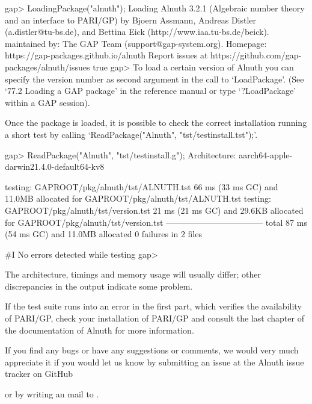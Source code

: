 \beginexample
    gap> LoadingPackage("alnuth");
    Loading  Alnuth 3.2.1 (Algebraic number theory and an interface to PARI/GP)
    by Bjoern Assmann,
       Andreas Distler (a.distler@tu-bs.de), and
       Bettina Eick (http://www.iaa.tu-bs.de/beick).
    maintained by:
       The GAP Team (support@gap-system.org).
    Homepage: https://gap-packages.github.io/alnuth
    Report issues at https://github.com/gap-packages/alnuth/issues
    true
    gap>
\endexample
To load a certain version of Alnuth you can specify the version number as
second argument in the call to `LoadPackage'. (See `77.2 Loading a GAP
package' in the reference manual or type `?LoadPackage' within a GAP session).

Once the package is loaded, it is possible to check the correct installation
running a short test by calling `ReadPackage("Alnuth",
"tst/testinstall.tst");'.

\beginexample
    gap> ReadPackage("Alnuth", "tst/testinstall.g");
    Architecture: aarch64-apple-darwin21.4.0-default64-kv8

    testing: GAPROOT/pkg/alnuth/tst/ALNUTH.tst
          66 ms (33 ms GC) and 11.0MB allocated for GAPROOT/pkg/alnuth/tst/ALNUTH.tst
    testing: GAPROOT/pkg/alnuth/tst/version.tst
          21 ms (21 ms GC) and 29.6KB allocated for GAPROOT/pkg/alnuth/tst/version.tst
    -----------------------------------
    total        87 ms (54 ms GC) and 11.0MB allocated
                  0 failures in 2 files

    #I  No errors detected while testing
    gap>
\endexample

The architecture, timings and memory usage will usually differ; other
discrepancies in the output indicate some problem.

If the test suite runs into an error in the first part, which verifies the
availability of PARI/GP, check your installation of PARI/GP and consult the
last chapter of the documentation of Alnuth for more information.

If you find any bugs or have any suggestions or comments, we would very much
appreciate it if you would let us know by submitting an issue at the Alnuth
issue tracker on GitHub 

or by writing an mail to .
